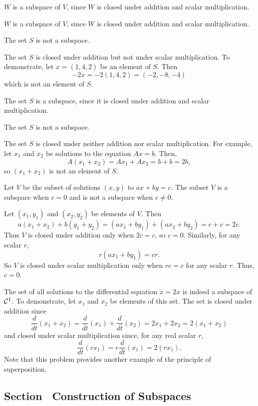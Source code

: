 \documentclass{ximera}
\begin{document}
\newpage
{} $W$ is a subspace of $V$, since $W$ is closed under
addition and scalar multiplication.

 $W$ is a subspace of $V$, since $W$ is closed under
addition and scalar multiplication.

 \ans The set $S$ is not a subspace.

\soln The set $S$ is closed under addition but not under scalar
multiplication.  To demonstrate, let $x = (1,4,2)$ be an element of $S$. 
Then
\[
-2x = -2(1,4,2) = (-2,-8,-4)
\]
which is not an element of $S$.

 The set $S$ is a subspace, since it is closed under
addition and scalar multiplication.

 \ans The set $S$ is not a subspace.

\soln The set $S$ is closed under neither addition nor scalar
multiplication.  For example, let $x_1$ and $x_2$ be solutions to the
equation $Ax = b$.  Then,
\[
A(x_1 + x_2) = Ax_1 + Ax_2 = b + b = 2b,
\]
so $(x_1 + x_2)$ is not an element of $S$.

\ans Let $V$ be the subset of solutions $(x,y)$ to $ax + by = c$.
The subset $V$ is a subspace when $c = 0$ and is not a subspace
when $c \neq 0$. 

\soln Let $(x_1,y_1)$ and $(x_2,y_2)$ be elements of $V$.  Then
\[
a(x_1 + x_2) + b(y_1 + y_2) = (ax_1 + by_1) + (ax_2 + by_2) =
c + c = 2c.
\]
Thus $V$ is closed under addition only when $2c = c$, so $c = 0$.
Similarly, for any scalar $r$,
\[
r(ax_1 + by_1) = cr.
\]
So $V$ is closed under scalar multiplication only when $rc = c$ for
any scalar $r$.  Thus, $c = 0$.

The set of all solutions to the differential equation $\dot{x} = 2x$ is
indeed a subspace of ${\cal C}^1$.  To demonstrate, let $x_1$ and $x_2$
be elements of this set.  The set is closed under addition since
\[
\frac{d}{dt}(x_1 + x_2) = \frac{d}{dt}(x_1) + \frac{d}{dt}(x_2)
= 2x_1 + 2x_2 = 2(x_1 + x_2)
\]
and closed under scalar multiplication since, for any real scalar $r$,
\[
\frac{d}{dt}(rx_1) = r\frac{d}{dt}(x_1) = 2(rx_1).
\]
Note that this problem provides another example of the principle of
superposition.



\newpage
\subsection*{Section~\protect{\ref{S:5.2}} Construction of Subspaces}
\end{document}
